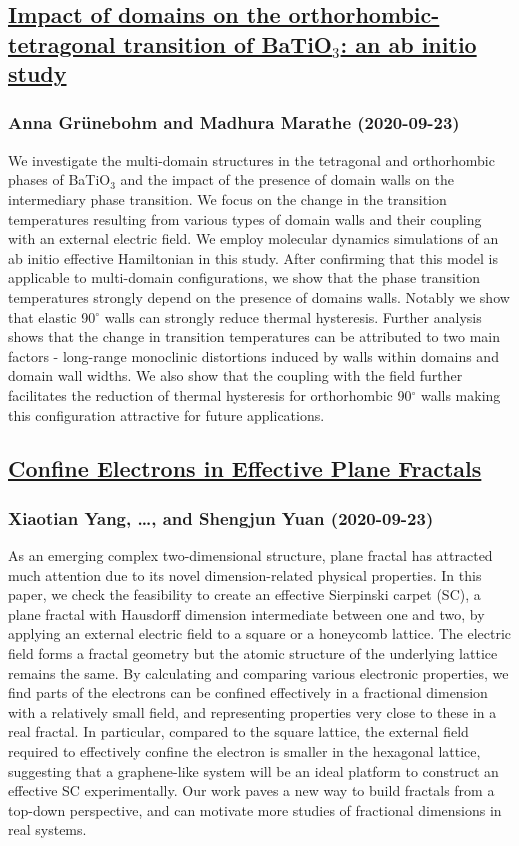 \subsection*{\href{http://arxiv.org/abs/2009.11165v1}{Impact of domains on the orthorhombic-tetragonal transition of  BaTiO$_3$: an ab initio study}}
\subsubsection*{Anna Grünebohm and Madhura Marathe (2020-09-23)}
We investigate the multi-domain structures in the tetragonal and orthorhombic
phases of BaTiO$_3$ and the impact of the presence of domain walls on the
intermediary phase transition. We focus on the change in the transition
temperatures resulting from various types of domain walls and their coupling
with an external electric field. We employ molecular dynamics simulations of an
ab initio effective Hamiltonian in this study. After confirming that this model
is applicable to multi-domain configurations, we show that the phase transition
temperatures strongly depend on the presence of domains walls. Notably we show
that elastic 90$^{\circ}$ walls can strongly reduce thermal hysteresis. Further
analysis shows that the change in transition temperatures can be attributed to
two main factors - long-range monoclinic distortions induced by walls within
domains and domain wall widths. We also show that the coupling with the field
further facilitates the reduction of thermal hysteresis for orthorhombic
90$^{\circ}$ walls making this configuration attractive for future
applications.

\subsection*{\href{http://arxiv.org/abs/2009.11163v2}{Confine Electrons in Effective Plane Fractals}}
\subsubsection*{Xiaotian Yang, \dots, and Shengjun Yuan (2020-09-23)}
As an emerging complex two-dimensional structure, plane fractal has attracted
much attention due to its novel dimension-related physical properties. In this
paper, we check the feasibility to create an effective Sierpinski carpet (SC),
a plane fractal with Hausdorff dimension intermediate between one and two, by
applying an external electric field to a square or a honeycomb lattice. The
electric field forms a fractal geometry but the atomic structure of the
underlying lattice remains the same. By calculating and comparing various
electronic properties, we find parts of the electrons can be confined
effectively in a fractional dimension with a relatively small field, and
representing properties very close to these in a real fractal. In particular,
compared to the square lattice, the external field required to effectively
confine the electron is smaller in the hexagonal lattice, suggesting that a
graphene-like system will be an ideal platform to construct an effective SC
experimentally. Our work paves a new way to build fractals from a top-down
perspective, and can motivate more studies of fractional dimensions in real
systems.

